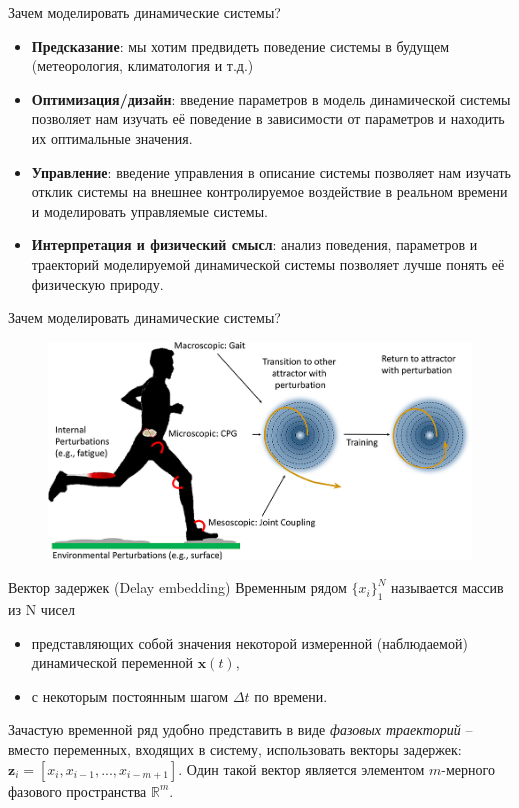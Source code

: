 \begin{frame}{Зачем моделировать динамические системы?}

\begin{itemize}
\item \textbf{Предсказание}: мы хотим предвидеть поведение системы в будущем (метеорология, климатология и т.д.)
\item \textbf{Оптимизация/дизайн}: введение параметров в модель динамической системы позволяет нам изучать её поведение в зависимости от параметров и находить их оптимальные значения.
\item \textbf{Управление}: введение управления в описание системы позволяет нам изучать отклик системы на внешнее контролируемое воздействие в реальном времени и моделировать управляемые системы.
\item \textbf{Интерпретация и физический смысл}: анализ поведения, параметров и траекторий моделируемой динамической системы позволяет лучше понять её физическую природу. 
\end{itemize}
\end{frame}
\begin{frame}{Зачем моделировать динамические системы?}
\begin{figure}
    \centering
    \includegraphics[width=\textwidth]{lecture_5/figs/DS-1.jpg}
\end{figure}

\end{frame}
\begin{frame}{Вектор задержек (Delay embedding)}
Временным рядом $\{x_i\}_1^N $ называется массив из N чисел
\begin{itemize}
    \item представляющих собой значения некоторой измеренной (наблюдаемой) динамической переменной $\textbf{x}(t)$,
    \item с некоторым постоянным шагом $\Delta t$ по времени.
\end{itemize} 
 Зачастую временной ряд удобно представить в виде \textit{фазовых траекторий} 
-- вместо переменных, входящих в систему, использовать векторы задержек: $\mathbf{z}_i = [x_i, x_{i-1}, ..., x_{i-m+1}]$. Один такой вектор является элементом $m$-мерного фазового пространства $\mathbb{R}^m$.

\begin{figure}
    \centering
\end{figure}

\end{frame}
